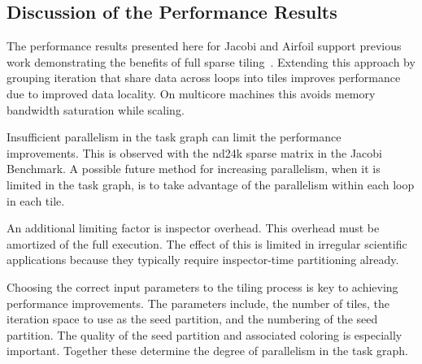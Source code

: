 \subsection{Discussion of the Performance Results}

The performance results presented here for Jacobi and Airfoil support 
previous work demonstrating the benefits of full sparse 
tiling~\cite{StroutIJHPCA,StroutPLDI03,commAvoidingSparse2009}.
Extending this approach by grouping iteration that share data across 
loops into tiles improves performance due to improved data locality. 
On multicore machines this avoids memory bandwidth saturation while scaling.

Insufficient parallelism in the task graph can limit the performance improvements. 
This is observed with the nd24k sparse matrix in the Jacobi Benchmark.
A possible future method for increasing parallelism, when it is limited in the task 
graph, is to take advantage of the parallelism within each loop in each tile.

An additional limiting factor is inspector overhead. This overhead 
must be amortized of the full execution. The effect of this is limited 
in irregular scientific applications because they typically require inspector-time partitioning already.

Choosing the correct input parameters to the tiling process is key to 
achieving performance improvements. The parameters include, the 
number of tiles, the iteration space to use as the seed partition, and 
the numbering of the seed partition. The quality of the seed partition 
and associated coloring is especially important. Together these determine 
the degree of parallelism in the task graph. 



